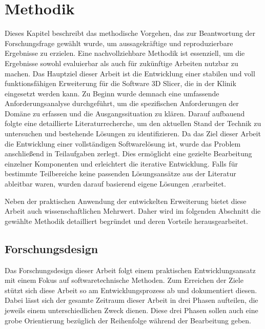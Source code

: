 \chapter{Methodik}
\label{chap:methodik} Dieses Kapitel beschreibt das methodische Vorgehen, das
zur Beantwortung der Forschungsfrage gewählt wurde, um aussagekräftige und reproduzierbare
Ergebnisse zu erzielen. Eine nachvollziehbare Methodik ist essenziell, um die Ergebnisse
sowohl evaluierbar als auch für zukünftige Arbeiten nutzbar zu machen. Das
Hauptziel dieser Arbeit ist die Entwicklung einer stabilen und voll
funktionsfähigen Erweiterung für die Software 3D Slicer, die in der Klinik eingesetzt
werden kann. Zu Beginn wurde demnach eine umfassende Anforderungsanalyse
durchgeführt, um die spezifischen Anforderungen der Domäne zu erfassen und die Ausgangssituation
zu klären. Darauf aufbauend folgte eine detaillierte Literaturrecherche, um den aktuellen
Stand der Technik zu untersuchen und bestehende Lösungen zu identifizieren. Da
das Ziel dieser Arbeit die Entwicklung einer vollständigen Softwarelösung ist, wurde
das Problem anschließend in Teilaufgaben zerlegt. Dies ermöglicht eine gezielte
Bearbeitung einzelner Komponenten und erleichtert die iterative Entwicklung. Falls
für bestimmte Teilbereiche keine passenden Lösungsansätze aus der Literatur ableitbar
waren, wurden darauf basierend eigene Lösungen ‚erarbeitet.

Neben der praktischen Anwendung der entwickelten Erweiterung bietet diese Arbeit
auch wissenschaftlichen Mehrwert. Daher wird im folgenden Abschnitt die gewählte
Methodik detailliert begründet und deren Vorteile herausgearbeitet.

\section{Forschungsdesign}
Das Forschungsdesign dieser Arbeit folgt einem praktischen Entwicklungsansatz mit
einem Fokus auf softwaretechnische Methoden. Zum Erreichen der Ziele stützt sich
diese Arbeit so am Entwicklungsprozess ab und dokumentiert diesen. Dabei lässt sich
der gesamte Zeitraum dieser Arbeit in drei Phasen aufteilen, die jeweils einem
unterschiedlichen Zweck dienen. Diese drei Phasen sollen auch eine grobe Orientierung
bezüglich der Reihenfolge während der Bearbeitung geben.

\pagebreak

